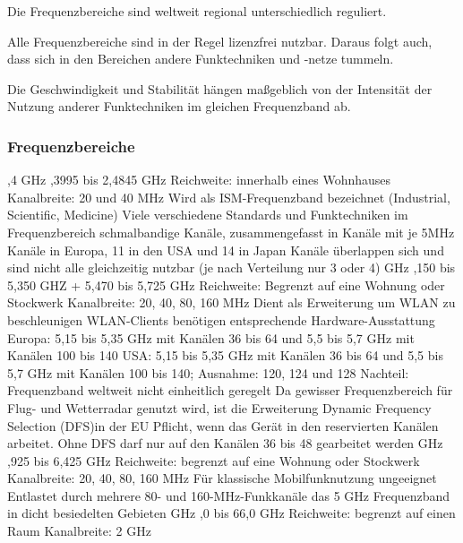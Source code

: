 \documentclass[10pt]{article}
\begin{document}
\begin{flushleft}
Die Frequenzbereiche sind weltweit regional unterschiedlich reguliert.

Alle Frequenzbereiche sind in der Regel lizenzfrei nutzbar. Daraus folgt auch, dass sich in den Bereichen andere Funktechniken und -netze tummeln.

Die Geschwindigkeit und Stabilität hängen maßgeblich von der Intensität der Nutzung anderer Funktechniken im gleichen Frequenzband ab.

\break

\subsubsection{Frequenzbereiche}

\begin{outline}
    ,4 GHz
        ,3995 bis 2,4845 GHz
        \2 Reichweite: innerhalb eines Wohnhauses
        \2 Kanalbreite: 20 und 40 MHz
        \2 Wird als ISM-Frequenzband bezeichnet (Industrial, Scientific, Medicine)
        \2 Viele verschiedene Standards und Funktechniken im Frequenzbereich
         schmalbandige Kanäle, zusammengefasst in Kanäle mit je 5MHz
         Kanäle in Europa, 11 in den USA und 14 in Japan
        \2 Kanäle überlappen sich und sind nicht alle gleichzeitig nutzbar (je nach Verteilung nur 3 oder 4)
     GHz
        ,150 bis 5,350 GHZ + 5,470 bis 5,725 GHz
        \2 Reichweite: Begrenzt auf eine Wohnung oder Stockwerk
        \2 Kanalbreite: 20, 40, 80, 160 MHz
        \2 Dient als Erweiterung um WLAN zu beschleunigen
        \2 WLAN-Clients benötigen entsprechende Hardware-Ausstattung
        \2 Europa: 5,15 bis 5,35 GHz mit Kanälen 36 bis 64 und 5,5 bis 5,7 GHz mit Kanälen 100 bis 140
        \2 USA: 5,15 bis 5,35 GHz mit Kanälen 36 bis 64 und 5,5 bis 5,7 GHz mit Kanälen 100 bis 140; Ausnahme: 120, 124 und 128
        \2 Nachteil: Frequenzband weltweit nicht einheitlich geregelt
        \2 Da gewisser Frequenzbereich für Flug- und Wetterradar genutzt wird, ist die Erweiterung Dynamic Frequency Selection (DFS)in der EU Pflicht, wenn das Gerät in den reservierten Kanälen arbeitet.
        \2 Ohne DFS darf nur auf den Kanälen 36 bis 48 gearbeitet werden
     GHz
        ,925 bis 6,425 GHz
        \2 Reichweite: begrenzt auf eine Wohnung oder Stockwerk
        \2 Kanalbreite: 20, 40, 80, 160 MHz
        \2 Für klassische Mobilfunknutzung ungeeignet
        \2 Entlastet durch mehrere 80- und 160-MHz-Funkkanäle das 5 GHz Frequenzband in dicht besiedelten Gebieten
     GHz
        ,0 bis 66,0 GHz
        \2 Reichweite: begrenzt auf einen Raum
        \2 Kanalbreite: 2 GHz
\end{outline}


\end{flushleft}
\end{document}
